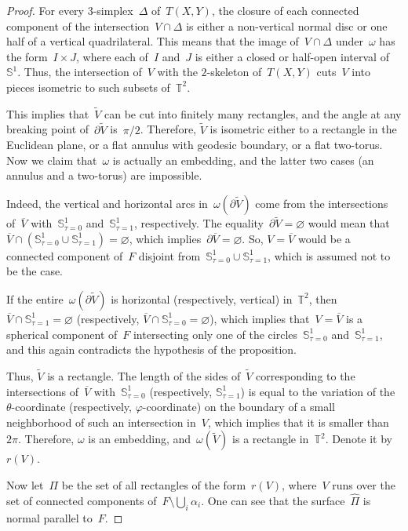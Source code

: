 \documentclass{amsart}
\theoremstyle{theorem}
\theoremstyle{remark}
\theoremstyle{definition}
\numberwithin{equation}{section}
\numberwithin{figure}{section}
\begin{document}
\begin{proof}
For every $3$-simplex~$\Delta$ of~$T(X,Y)$,
the closure of each connected component of the intersection~$V\cap\Delta$ is either a non-vertical normal disc
or one half of a vertical quadrilateral. This means that the image of~$V\cap\Delta$ under~$\omega$
has the form~$I\times J$, where each of~$I$ and~$J$ is either a closed or half-open interval of~$\mathbb S^1$.
Thus, the intersection of~$V$ with the $2$-skeleton of~$T(X,Y)$ cuts~$V$ into pieces isometric to such
subsets of~$\mathbb T^2$.

This implies that~$\widetilde V$ can be cut into finitely many rectangles, and the angle at any breaking point
of~$\partial\widetilde V$ is~$\pi/2$. Therefore, $\widetilde V$
is isometric either to a rectangle in the Euclidean plane, or a flat annulus with geodesic
boundary, or a flat two-torus. Now we claim that~$\omega$ is actually an embedding, and the latter
two cases (an annulus and a two-torus) are impossible.

Indeed, the vertical and horizontal arcs in~$\omega(\partial\widetilde V)$ come from the intersections of~$\overline V$
with~$\mathbb S^1_{\tau=0}$ and~$\mathbb S^1_{\tau=1}$, respectively. The equality~$\partial\widetilde V=\varnothing$
would mean that~$\overline V\cap(\mathbb S^1_{\tau=0}\cup\mathbb S^1_{\tau=1})=\varnothing$,
which implies~$\partial\overline V=\varnothing$. So, $V=\overline V$ would be a connected component of~$F$
disjoint from~$\mathbb S^1_{\tau=0}\cup\mathbb S^1_{\tau=1}$, which is assumed not to be the case.

If the entire~$\omega(\partial\widetilde V)$ is horizontal (respectively, vertical) in~$\mathbb T^2$,
then~$\overline V\cap\mathbb S^1_{\tau=1}=\varnothing$ (respectively, $\overline V\cap\mathbb S^1_{\tau=0}=\varnothing$),
which implies that~$V=\overline V$ is a spherical component of~$F$ intersecting only one of the
circles~$\mathbb S^1_{\tau=0}$ and~$\mathbb S^1_{\tau=1}$, and this again contradicts the hypothesis of the proposition.

Thus, $\widetilde V$ is a rectangle. The length of the sides of~$\widetilde V$ corresponding to
the intersections of~$\overline V$ with~$\mathbb S^1_{\tau=0}$ (respectively, $\mathbb S^1_{\tau=1}$) is equal to the variation of the
$\theta$-coordinate (respectively, $\varphi$-coordinate) on the boundary of a small neighborhood of such an intersection in~$V$, which implies that it is smaller than~$2\pi$. Therefore, $\omega$ is an embedding, and~$\omega(\widetilde V)$ is a rectangle in~$\mathbb T^2$.
Denote it by~$r(V)$.

Now let~$\Pi$ be the set of all rectangles of the form~$r(V)$, where~$V$ runs over the set of connected
components of~$F\setminus\bigcup_i\alpha_i$. One can see that the surface~$\widehat\Pi$ is normal parallel to~$F$.
\end{proof}
\end{document}
